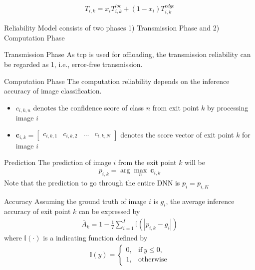 \begin{enumdescript}
\begin{enumdescript}
\begin{enumdescript}
			\begin{align}
			T_{i,k}=x_i T_{i,k}^{loc} +(1-x_i)T_{i,k}^{edge}
			\end{align}
		\end{enumdescript}
		\item[Reliability Model] consists of two phases 1) Transmission Phase and 2) Computation Phase 
		\begin{enumdescript}
			\item[Transmission Phase] As \gls{tcp} is used for offloading, the transmission reliability can be
			regarded as 1, i.e., error-free transmission.
			\item[Computation Phase]  The computation reliability depends on the inference accuracy of
			image classification.
			\begin{itemize}
				\item $ c_{i,k,n} $ denotes the confidence score of class $ n $ from exit point $ k $ by processing image $ i $
				\item $ \mathbf{c}_{i,k} = \left[\begin{array}{cccc}c_{i,k,1} & c_{i,k,2} & \dots & c_{i,k,N}\end{array}\right] $ denotes the score vector of exit point $ k $ for image $ i $
			\end{itemize}
			\begin{enumdescript}
				\item[Prediction] The prediction of image $ i $ from the exit point $ k $ will be
				\begin{align}
				p_{i,k} = \arg \underset{n}{\max}\: \mathbf{c}_{i,k}
				\end{align}
				Note that the prediction to go through the entire DNN is $ p_i  = p_{i,K} $
				\item[Accuracy] Assuming the ground truth of image $ i $ is $ g_i $, the average inference accuracy of exit point $ k $ can be expressed by
				\begin{align}
				\bar{A}_{k}=1-\frac{1}{I} \sum_{i=1}^{I} \mathbb{I}\left(\left|p_{i,k}-g_{i}\right|\right)
				\end{align}
				where $ \mathbb{I(\cdot)}  $ is a indicating function defined by
				\begin{align}
				\mathbb{I}(y)= \begin{cases}
				0, & \mathrm{if\:} y \leq 0, \\
				1, & \mathrm{otherwise}
				\end{cases}
				\end{align}
			\end{enumdescript}

\end{enumdescript}
\end{enumdescript}
\end{enumdescript}
